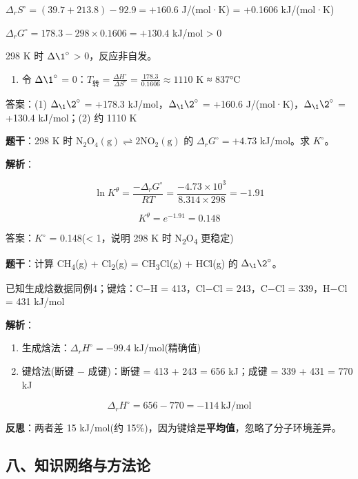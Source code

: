 \(\Delta_r S^\circ = (39.7 + 213.8) - 92.9 = +160.6\) J/(mol·K) = +0.1606 kJ/(mol·K)

\(\Delta_r G^\circ = 178.3 - 298 \times 0.1606 = +130.4\) kJ/mol \textgreater{} 0

298 K 时 \(\Delta \1^{\circ}\) \textgreater{} 0，反应非自发。

\begin{enumerate}
\def\labelenumi{(\arabic{enumi})}
\setcounter{enumi}{1}
\tightlist
\item
  令 \(\Delta \1^{\circ}\) = 0：\(T_{\text{转}} = \frac{\Delta H^\circ}{\Delta S^\circ} = \frac{178.3}{0.1606} \approx 1110\) K ≈ 837°C
\end{enumerate}

答案：(1) \(\Delta_{\1} \2^{\circ}\) = +178.3 kJ/mol，\(\Delta_{\1} \2^{\circ}\) = +160.6 J/(mol·K)，\(\Delta_{\1} \2^{\circ}\) = +130.4 kJ/mol；(2) 约 1110 K

\textbf{题干}：298 K 时 \(\mathrm{N_2O_4(g) \rightleftharpoons 2NO_2(g)}\) 的 \(\Delta_r G^\circ = +4.73\) kJ/mol。求 \(K^{\circ}\)。

\textbf{解析}：

\[\ln K^\theta = \frac{-\Delta_r G^\circ}{RT} = \frac{-4.73 \times 10^3}{8.314 \times 298} = -1.91\]

\[K^\theta = e^{-1.91} = 0.148\]

答案：\(K^{\circ}\) = 0.148(\textless{} 1，说明 298 K 时 N\textsubscript{2}O\textsubscript{4} 更稳定)

\textbf{题干}：计算 CH\textsubscript{4}(g) + Cl\textsubscript{2}(g) = CH\textsubscript{3}Cl(g) + HCl(g) 的 \(\Delta_{\1} \2^{\circ}\)。

已知生成焓数据同例4；键焓：C−H = 413，Cl−Cl = 243，C−Cl = 339，H−Cl = 431 kJ/mol

\textbf{解析}：

\begin{enumerate}
\def\labelenumi{(\arabic{enumi})}
\item
  生成焓法：\(\Delta_r H^\circ = -99.4\) kJ/mol(精确值)
\item
  键焓法(断键 − 成键)：断键 = 413 + 243 = 656 kJ；成键 = 339 + 431 = 770 kJ
\end{enumerate}

\[\Delta_r H^\circ = 656 - 770 = -114\ \mathrm{kJ/mol}\]

\textbf{反思}：两者差 15 kJ/mol(约 15\%)，因为键焓是\textbf{平均值}，忽略了分子环境差异。

\subsection{八、知识网络与方法论}\label{ux516bux77e5ux8bc6ux7f51ux7edcux4e0eux65b9ux6cd5ux8bba}

